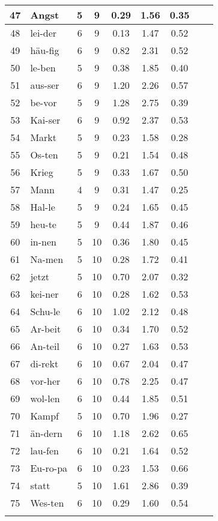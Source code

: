 {\begin{longtable}{clccccccc}
47 & Angst & 5 & 9 & 0.29 & 1.56 & 0.35 \\ \hline
48 & lei-der & 6 & 9 & 0.13 & 1.47 & 0.52 \\ \hline
49 & häu-fig & 6 & 9 & 0.82 & 2.31 & 0.52 \\ \hline
50 & le-ben & 5 & 9 & 0.38 & 1.85 & 0.40 \\ \hline
51 & aus-ser & 6 & 9 & 1.20 & 2.26 & 0.57 \\ \hline
52 & be-vor & 5 & 9 & 1.28 & 2.75 & 0.39 \\ \hline
53 & Kai-ser & 6 & 9 & 0.92 & 2.37 & 0.53 \\ \hline
54 & Markt & 5 & 9 & 0.23 & 1.58 & 0.28 \\ \hline
55 & Os-ten & 5 & 9 & 0.21 & 1.54 & 0.48 \\ \hline
56 & Krieg & 5 & 9 & 0.33 & 1.67 & 0.50 \\ \hline
57 & Mann & 4 & 9 & 0.31 & 1.47 & 0.25 \\ \hline
58 & Hal-le & 5 & 9 & 0.24 & 1.65 & 0.45 \\ \hline
59 & heu-te & 5 & 9 & 0.44 & 1.87 & 0.46 \\ \hline
60 & in-nen & 5 & 10 & 0.36 & 1.80 & 0.45 \\ \hline
61 & Na-men & 5 & 10 & 0.28 & 1.72 & 0.41 \\ \hline
62 & jetzt & 5 & 10 & 0.70 & 2.07 & 0.32 \\ \hline
63 & kei-ner & 6 & 10 & 0.28 & 1.62 & 0.53 \\ \hline
64 & Schu-le & 6 & 10 & 1.02 & 2.12 & 0.48 \\ \hline
65 & Ar-beit & 6 & 10 & 0.34 & 1.70 & 0.52 \\ \hline
66 & An-teil & 6 & 10 & 0.27 & 1.63 & 0.53 \\ \hline
67 & di-rekt & 6 & 10 & 0.67 & 2.04 & 0.47 \\ \hline
68 & vor-her & 6 & 10 & 0.78 & 2.25 & 0.47 \\ \hline
69 & wol-len & 6 & 10 & 0.44 & 1.85 & 0.51 \\ \hline
70 & Kampf & 5 & 10 & 0.70 & 1.96 & 0.27 \\ \hline
71 & än-dern & 6 & 10 & 1.18 & 2.62 & 0.65 \\ \hline
72 & lau-fen & 6 & 10 & 0.21 & 1.64 & 0.52 \\ \hline
73 & Eu-ro-pa & 6 & 10 & 0.23 & 1.53 & 0.66 \\ \hline
74 & statt & 5 & 10 & 1.61 & 2.86 & 0.39 \\ \hline
75 & Wes-ten & 6 & 10 & 0.29 & 1.60 & 0.54 \\
\bottomrule
\label{tab:wordlist}
\end{longtable}
}